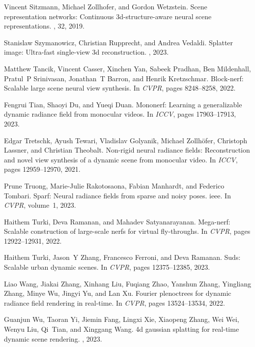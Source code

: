 \documentclass{article}
\begin{document}
{\begin{thebibliography}{10}
Vincent Sitzmann, Michael Zollhofer, and Gordon Wetzstein.
\newblock Scene representation networks: Continuous 3d-structure-aware neural scene representations.
, 32, 2019.

Stanislaw Szymanowicz, Christian Rupprecht, and Andrea Vedaldi.
\newblock Splatter image: Ultra-fast single-view 3d reconstruction.
, 2023.

Matthew Tancik, Vincent Casser, Xinchen Yan, Sabeek Pradhan, Ben Mildenhall, Pratul~P Srinivasan, Jonathan~T Barron, and Henrik Kretzschmar.
\newblock Block-nerf: Scalable large scene neural view synthesis.
\newblock In {\em CVPR}, pages 8248--8258, 2022.

Fengrui Tian, Shaoyi Du, and Yueqi Duan.
\newblock Mononerf: Learning a generalizable dynamic radiance field from monocular videos.
\newblock In {\em ICCV}, pages 17903--17913, 2023.

Edgar Tretschk, Ayush Tewari, Vladislav Golyanik, Michael Zollh{\"o}fer, Christoph Lassner, and Christian Theobalt.
\newblock Non-rigid neural radiance fields: Reconstruction and novel view synthesis of a dynamic scene from monocular video.
\newblock In {\em ICCV}, pages 12959--12970, 2021.

Prune Truong, Marie-Julie Rakotosaona, Fabian Manhardt, and Federico Tombari.
\newblock Sparf: Neural radiance fields from sparse and noisy poses. ieee.
\newblock In {\em CVPR}, volume~1, 2023.

Haithem Turki, Deva Ramanan, and Mahadev Satyanarayanan.
\newblock Mega-nerf: Scalable construction of large-scale nerfs for virtual fly-throughs.
\newblock In {\em CVPR}, pages 12922--12931, 2022.

Haithem Turki, Jason~Y Zhang, Francesco Ferroni, and Deva Ramanan.
\newblock Suds: Scalable urban dynamic scenes.
\newblock In {\em CVPR}, pages 12375--12385, 2023.

Liao Wang, Jiakai Zhang, Xinhang Liu, Fuqiang Zhao, Yanshun Zhang, Yingliang Zhang, Minye Wu, Jingyi Yu, and Lan Xu.
\newblock Fourier plenoctrees for dynamic radiance field rendering in real-time.
\newblock In {\em CVPR}, pages 13524--13534, 2022.

Guanjun Wu, Taoran Yi, Jiemin Fang, Lingxi Xie, Xiaopeng Zhang, Wei Wei, Wenyu Liu, Qi~Tian, and Xinggang Wang.
\newblock 4d gaussian splatting for real-time dynamic scene rendering.
, 2023.


\end{thebibliography}}
\end{document}
